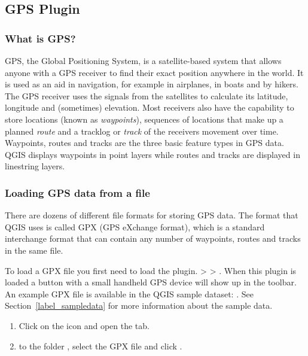 
\subsection{GPS Plugin}\label{label_plugingps}


\subsubsection{What is GPS?}\label{whatsgps}

GPS, the Global Positioning System, is a satellite-based system that allows anyone with a GPS receiver to find their exact position anywhere in the world.
It is used as an aid in navigation, for example in airplanes, in boats and by hikers.
The GPS receiver uses the signals from the satellites to calculate its latitude, longitude and (sometimes) elevation.
Most receivers also have the capability to store locations (known as \emph{waypoints}), sequences of locations that make up a planned \emph{route} and a tracklog or \emph{track} of the receivers movement over time.
Waypoints, routes and tracks are the three basic feature types in GPS data.
QGIS displays waypoints in point layers while routes and tracks are displayed in linestring layers.

\subsubsection{Loading GPS data from a file}\label{label_loadgps}

There are dozens of different file formats for storing GPS data.
The format that QGIS uses is called GPX (GPS eXchange format), which is a standard interchange format that can contain any number of waypoints, routes and tracks in the same file.

To load a GPX file you first need to load the plugin.
 >  > . When this plugin is loaded a button with a 
small handheld GPS device will show up in the toolbar. An example GPX file is 
available in the QGIS sample dataset:
. See
Section~\ref{label_sampledata} for more information about the sample data.

\begin{enumerate}
\item Click on the  icon and open the
 tab.
\item {} to the folder ,
select the GPX file  and click .
\end{enumerate}

